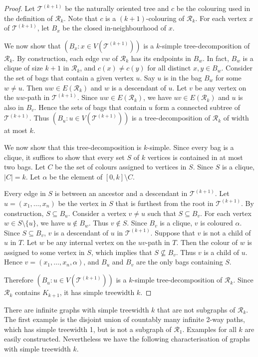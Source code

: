 \documentclass[a4paper,11pt]{article}
\theoremstyle{plain}
\theoremstyle{definition}
\newcommand{\TT}{\mathcal{T}}
\newcommand{\RR}{\mathcal{R}}
\begin{document}
\begin{proof}
Let $\TT^{(k+1)}$ be the naturally oriented tree and $c$ be the colouring used in the definition of $\RR_k$. Note that $c$ is a $(k+1)$-colouring of $\RR_k$. For each vertex $x$ of $\TT^{(k+1)}$, let $B_x$ be the closed in-neighbourhood of $x$. 

We now show that $(B_x:x\in V(\TT^{(k+1)}))$ is a $k$-simple tree-decomposition of $\RR_k$. By construction, each edge $vw$ of $\RR_k$ has its endpoints in $B_w$. In fact, $B_w$ is a clique of size $k+1$ in $\RR_k$, and $c(x) \neq c(y)$ for all distinct $x,y \in B_w$. 
Consider the set of bags that contain a given vertex $u$.  Say $u$ is in the bag $B_w$ for some $w\neq u$. Then $uw\in E(\RR_k)$ and $w$ is a descendant of $u$. Let $v$ be any vertex on the $uw$-path in $\TT^{(k+1)}$. Since $uw\in E(\RR_k)$, we have  $uv\in E(\RR_k)$ and $u$ is also in $B_v$. Hence the sets of bags that contain $u$ form a connected subtree of $\TT^{(k+1)}$. Thus $(B_u:u\in V(\TT^{(k+1)}))$ is a tree-decomposition of $\RR_k$ of width at most $k$. 

We now show that this tree-decomposition is $k$-simple. Since every bag is a clique, it suffices to show that every set $S$ of $k$ vertices is contained in at most two bags. Let $C$ be the set of colours assigned to vertices in $S$. Since $S$ is a clique, $|C|=k$. Let $\alpha$ be the element of $[0,k]\setminus C$. 

Every edge in $S$ is between an ancestor and a descendant in $\TT^{(k+1)}$. Let $u=(x_1,\dots,x_n)$ be the vertex in $S$ that is furthest from the root in $\TT^{(k+1)}$. By construction, $S\subseteq B_u$. Consider a vertex $v\neq u$ such that $S\subseteq B_v$. For each vertex $w\in S\setminus\{u\}$, we have $u\not\in B_w$. Thus $v\not\in S$. Since $B_v$ is a clique, $v$ is coloured $\alpha$. Since $S\subseteq B_v$, $v$ is a descendant of $u$ in $\TT^{(k+1)}$. Suppose that $v$ is not a child of $u$ in $T$. Let $w$ be any internal vertex on the $uv$-path in $T$. Then the colour of $w$ is assigned to some vertex in $S$, which implies that $S\not\subseteq B_v$. Thus $v$ is a child of $u$. Hence $v=(x_1,\dots,x_n,\alpha)$, and $B_u$ and $B_v$ are the only bags containing $S$. 

Therefore $(B_u:u\in V(\TT^{(k+1)}))$ is a $k$-simple tree-decomposition of $\RR_k$. Since $\RR_k$ contains $K_{k+1}$, it has simple treewidth $k$. \end{proof}

There are infinite graphs with simple treewidth $k$ that are not subgraphs of $\RR_k$. The first example is the disjoint union of countably many infinite 2-way paths, which has simple treewidth 1, but is not a subgraph of $\RR_1$. Examples for all $k$ are easily constructed. Nevertheless we have the following characterisation of graphs with simple treewidth $k$. 
\end{document}
